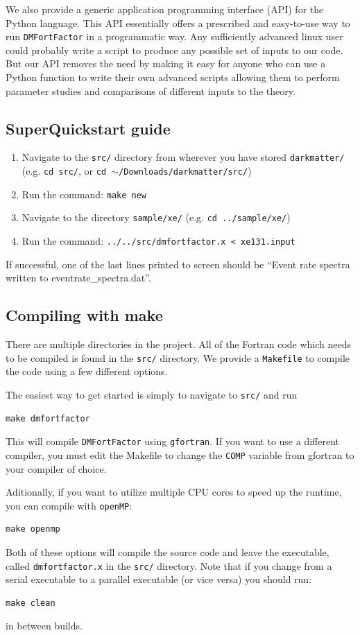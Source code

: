 \documentclass[11pt]{article}
\begin{document}
We also provide a generic application programming interface (API) for the Python language. 
This API essentially offers a prescribed and easy-to-use way to run {\tt DMFortFactor} 
in a programmatic way.  Any sufficiently advanced linux user could probably write a script to produce any
possible set of inputs to our code.  But our API removes the need by making it easy for anyone 
who can use a Python function to write their own advanced scripts allowing them to 
perform parameter studies and comparisons of different inputs to the theory.

\subsection{SuperQuickstart guide}
\begin{enumerate}
	\item Navigate to the {\tt src/} directory from wherever you have stored {\tt darkmatter/} (e.g. {\tt cd src/}, or {\tt cd $\sim$/Downloads/darkmatter/src/})
	\item Run the command: {\tt make new}
	\item Navigate to the directory {\tt sample/xe/} (e.g. {\tt cd ../sample/xe/})
	\item Run the command: {\tt ../../src/dmfortfactor.x < xe131.input}
\end{enumerate}
If successful,  one of the last lines printed to screen should be ``Event rate spectra written to eventrate_spectra.dat''.

\subsection{Compiling with make}
There are multiple directories in the project. All of the Fortran code which needs to be compiled is found in
the {\tt src/} directory.  We provide a {\tt Makefile} to compile the code using a few different options. 

The easiest way to get started is simply to navigate to {\tt src/}  and run
\begin{lstlisting}
make dmfortfactor
\end{lstlisting}
This will compile {\tt DMFortFactor} using {\tt gfortran}.  If you want to use a different compiler, you must 
edit the Makefile to change the {\tt COMP} variable from gfortran to your compiler of choice.

Aditionally, if you want to utilize multiple CPU cores to speed up the runtime, you can compile with {\tt openMP}:
\begin{lstlisting}
make openmp
\end{lstlisting}
Both of these options will compile the source code and leave the executable, called {\tt dmfortfactor.x} in the {\tt src/} directory.
Note that if you change from a serial executable to a parallel executable (or vice versa) you should run:
\begin{lstlisting}
make clean
\end{lstlisting}
in between builds.
\end{document}
